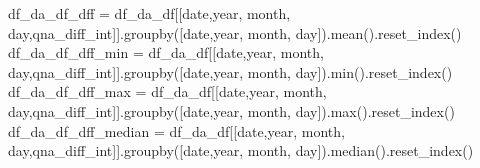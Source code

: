 \documentclass[
  letterpaper,
  DIV=11,
  numbers=noendperiod]{scrartcl}
\newenvironment{Shaded}{\begin{snugshade}}{\end{snugshade}}
\newcommand{\BuiltInTok}[1]{\textcolor[rgb]{0.00,0.23,0.31}{#1}}
\newcommand{\NormalTok}[1]{\textcolor[rgb]{0.00,0.23,0.31}{#1}}
\newcommand{\OperatorTok}[1]{\textcolor[rgb]{0.37,0.37,0.37}{#1}}
\newcommand{\StringTok}[1]{\textcolor[rgb]{0.13,0.47,0.30}{#1}}
\begin{document}
\begin{Shaded}
\begin{Highlighting}[]
\NormalTok{df\_da\_df\_dff        }\OperatorTok{=}\NormalTok{ df\_da\_df[[}\StringTok{\textquotesingle{}date\textquotesingle{}}\NormalTok{,}\StringTok{\textquotesingle{}year\textquotesingle{}}\NormalTok{, }\StringTok{\textquotesingle{}month\textquotesingle{}}\NormalTok{, }\StringTok{\textquotesingle{}day\textquotesingle{}}\NormalTok{,}\StringTok{\textquotesingle{}qna\_diff\_int\textquotesingle{}}\NormalTok{]].groupby([}\StringTok{\textquotesingle{}date\textquotesingle{}}\NormalTok{,}\StringTok{\textquotesingle{}year\textquotesingle{}}\NormalTok{, }\StringTok{\textquotesingle{}month\textquotesingle{}}\NormalTok{, }\StringTok{\textquotesingle{}day\textquotesingle{}}\NormalTok{]).mean().reset\_index()}
\NormalTok{df\_da\_df\_dff\_min    }\OperatorTok{=}\NormalTok{ df\_da\_df[[}\StringTok{\textquotesingle{}date\textquotesingle{}}\NormalTok{,}\StringTok{\textquotesingle{}year\textquotesingle{}}\NormalTok{, }\StringTok{\textquotesingle{}month\textquotesingle{}}\NormalTok{, }\StringTok{\textquotesingle{}day\textquotesingle{}}\NormalTok{,}\StringTok{\textquotesingle{}qna\_diff\_int\textquotesingle{}}\NormalTok{]].groupby([}\StringTok{\textquotesingle{}date\textquotesingle{}}\NormalTok{,}\StringTok{\textquotesingle{}year\textquotesingle{}}\NormalTok{, }\StringTok{\textquotesingle{}month\textquotesingle{}}\NormalTok{, }\StringTok{\textquotesingle{}day\textquotesingle{}}\NormalTok{]).}\BuiltInTok{min}\NormalTok{().reset\_index()}
\NormalTok{df\_da\_df\_dff\_max    }\OperatorTok{=}\NormalTok{ df\_da\_df[[}\StringTok{\textquotesingle{}date\textquotesingle{}}\NormalTok{,}\StringTok{\textquotesingle{}year\textquotesingle{}}\NormalTok{, }\StringTok{\textquotesingle{}month\textquotesingle{}}\NormalTok{, }\StringTok{\textquotesingle{}day\textquotesingle{}}\NormalTok{,}\StringTok{\textquotesingle{}qna\_diff\_int\textquotesingle{}}\NormalTok{]].groupby([}\StringTok{\textquotesingle{}date\textquotesingle{}}\NormalTok{,}\StringTok{\textquotesingle{}year\textquotesingle{}}\NormalTok{, }\StringTok{\textquotesingle{}month\textquotesingle{}}\NormalTok{, }\StringTok{\textquotesingle{}day\textquotesingle{}}\NormalTok{]).}\BuiltInTok{max}\NormalTok{().reset\_index()}
\NormalTok{df\_da\_df\_dff\_median }\OperatorTok{=}\NormalTok{ df\_da\_df[[}\StringTok{\textquotesingle{}date\textquotesingle{}}\NormalTok{,}\StringTok{\textquotesingle{}year\textquotesingle{}}\NormalTok{, }\StringTok{\textquotesingle{}month\textquotesingle{}}\NormalTok{, }\StringTok{\textquotesingle{}day\textquotesingle{}}\NormalTok{,}\StringTok{\textquotesingle{}qna\_diff\_int\textquotesingle{}}\NormalTok{]].groupby([}\StringTok{\textquotesingle{}date\textquotesingle{}}\NormalTok{,}\StringTok{\textquotesingle{}year\textquotesingle{}}\NormalTok{, }\StringTok{\textquotesingle{}month\textquotesingle{}}\NormalTok{, }\StringTok{\textquotesingle{}day\textquotesingle{}}\NormalTok{]).median().reset\_index()}
\end{Highlighting}
\end{Shaded}
\end{document}
